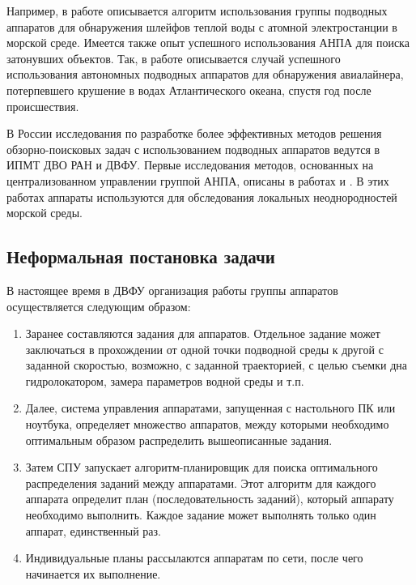 \documentclass[a4paper,14pt,russian]{article}
\begin{document}
Например, в работе \cite{cannell2006boundary} описывается алгоритм использования группы подводных аппаратов для обнаружения шлейфов теплой воды с атомной электростанции в морской среде.
Имеется также опыт успешного использования АНПА для поиска затонувших объектов.
Так, в работе \cite{purcell2011use} описывается случай успешного использования автономных подводных аппаратов для обнаружения авиалайнера, потерпевшего крушение в водах Атлантического океана, спустя год после происшествия.

В России исследования по разработке более эффективных методов решения обзорно-поисковых задач с использованием подводных аппаратов ведутся в ИПМТ ДВО РАН и ДВФУ. Первые исследования методов, основанных на централизованном управлении группой АНПА, описаны в работах \cite{tuphanov1} и \cite{tuphanov2}. В этих работах аппараты используются для обследования локальных неоднородностей морской среды.



\subsection{Неформальная постановка задачи}


В настоящее время в ДВФУ организация работы группы аппаратов осуществляется следующим образом:
\begin{enumerate}
\item Заранее составляются задания для аппаратов. Отдельное задание может заключаться в прохождении от одной точки подводной среды к другой с заданной скоростью, возможно, с заданной траекторией, с целью съемки дна гидролокатором, замера параметров водной среды и т.п.
\item Далее, система управления аппаратами, запущенная с настольного ПК или ноутбука, определяет множество аппаратов, между которыми необходимо оптимальным образом распределить вышеописанные задания.
\item Затем СПУ запускает алгоритм-планировщик для поиска оптимального распределения заданий между аппаратами. Этот алгоритм для каждого аппарата определит план (последовательность заданий), который аппарату необходимо выполнить. Каждое задание может выполнять только один аппарат, единственный раз.
\item Индивидуальные планы рассылаются аппаратам по сети, после чего начинается их выполнение.
\end{enumerate}
\end{document}

